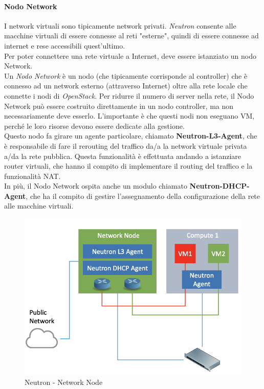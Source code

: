 \documentclass{article}
\begin{document}
\paragraph{Nodo Network} 
I network virtuali sono tipicamente network privati. \textit{Neutron} consente alle macchine virtuali di essere connesse al reti "esterne", quindi di essere connesse ad internet e rese accessibili quest'ultimo. \\ 
Per poter connettere una rete virtuale a Internet, deve essere istanziato un nodo Network. \\
Un \textit{Nodo Network} è un nodo (che tipicamente corrisponde al controller) che è connesso ad un network esterno (attraverso Internet) oltre alla rete locale che connette i nodi di \textit{OpenStack}. Per ridurre il numero di server nella rete, il Nodo Network può essere costruito direttamente in un nodo controller, ma non necessariamente deve esserlo. L'importante è che questi nodi non eseguano VM, perché le loro risorse devono essere dedicate alla gestione. \\
Questo nodo fa girare un agente particolare, chiamato \textbf{Neutron-L3-Agent}, che è responsabile di fare il rerouting del traffico da/a la network virtuale privata a/da la rete pubblica. Questa funzionalità è effettuata andando a istanziare router virtuali, che hanno il compito di implementare il routing del traffico e la funzionalità NAT. \\ 
In più, il Nodo Network ospita anche un modulo chiamato \textbf{Neutron-DHCP-Agent}, che ha il compito di gestire l'assegnamento della configurazione della rete alle macchine virtuali.
\begin{figure}[H]
    \centering
    \includegraphics[scale=0.5]{img/neutron network node.png}
    \caption{Neutron - Network Node}
\end{figure}\noindent
\end{document}
